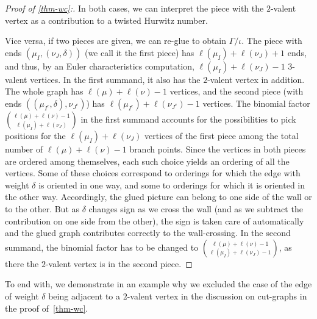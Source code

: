 \documentclass[10pt]{amsart}
\theoremstyle{plain}
\theoremstyle{definition}
\theoremstyle{definition}
\theoremstyle{plain}
\theoremstyle{plain}
\theoremstyle{remark}
\theoremstyle{plain}
\theoremstyle{plain}
\begin{document}
\begin{proof}[Proof of \cref{thm-wc}:]
In both cases, we can interpret the piece with the $2$-valent vertex as a contribution to a twisted Hurwitz number.

Vice versa, if two pieces are given, we can re-glue to obtain $\Gamma/\iota$. 
The piece with ends $(\mu_I,(\nu_J,\delta))$ (we call it the first piece) has $\ell(\mu_I)+\ell(\nu_J)+1$ ends, and thus, by an Euler characteristics computation, $\ell(\mu_I)+\ell(\nu_J)-1$ $3$-valent vertices. In the first summand, it also has the $2$-valent vertex in addition.
The whole graph has $\ell(\mu)+\ell(\nu)-1$ vertices, and the second piece (with ends  $((\mu_{I^c},\delta),\nu_{J^c})$)
has $\ell(\mu_{I^c})+\ell(\nu_{J^c})-1$ vertices. 
The binomial factor $\binom{\ell(\mu)+\ell(\nu)-1}{\ell(\mu_I)+\ell(\nu_J)}$ in the first summand accounts for the possibilities to pick positions for the $\ell(\mu_I)+\ell(\nu_J)$ vertices of the first piece among the total number of $\ell(\mu)+\ell(\nu)-1$ branch points. Since the vertices in both pieces are ordered among themselves, each such choice yields an ordering of all the vertices. Some of these choices correspond to orderings for which the edge with weight $\delta$ is oriented in one way, and some to orderings for which it is oriented in the other way. Accordingly, the glued picture can belong to one side of the wall or to the other. But as $\delta$ changes sign as we cross the wall (and as we subtract the contribution on one side from the other), the sign is taken care of automatically and the glued graph contributes correctly to the wall-crossing.
In the second summand, the binomial factor has to be changed to $\binom{\ell(\mu)+\ell(\nu)-1}{\ell(\mu_I)+\ell(\nu_J)-1}$, as there the $2$-valent vertex is in the second piece.
\end{proof}

To end with, we demonstrate in an example why we excluded the case of the edge of weight $\delta$ being adjacent to a $2$-valent vertex in the discussion on cut-graphs in the proof of~\cref{thm-wc}.
\end{document}
